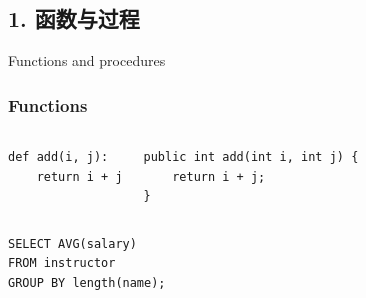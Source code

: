 \documentclass[aspectratio=169, 14pt]{beamer}
\begin{document}
{
\begin{frame}
	\section{\textcolor{darkmidnightblue}{1. 函数与过程}}
	Functions and procedures
\end{frame}

}

\begin{frame}[fragile]
	\frametitle{Functions}

	\begin{columns}
		\begin{verbatim}
def add(i, j):
    return i + j
    \end{verbatim}
		\begin{verbatim}
public int add(int i, int j) {
    return i + j;
}
     \end{verbatim}

	\end{columns}


	\begin{verbatim}
SELECT AVG(salary)
FROM instructor
GROUP BY length(name);
    \end{verbatim}

\end{frame}
\end{document}

